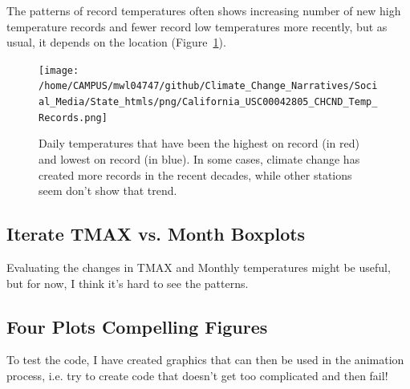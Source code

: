 \documentclass{article}
\begin{document}
\begin{knitrout}
\begin{kframe}
{\ttfamily\noindent\bfseries\color{errorcolor}{\#\# Error in h(simpleError(msg, call)): error in evaluating the argument 'x' in selecting a method for function 'plot': object 'R1' not found}}

{\ttfamily\noindent\bfseries\color{errorcolor}{\#\# Error in axis(2, at = ytics, labels = ylabs): object 'ytics' not found}}

{\ttfamily\noindent\bfseries\color{errorcolor}{\#\# Error in axis(1, at = xtics, labels = xlabs): object 'xtics' not found}}

{\ttfamily\noindent\bfseries\color{errorcolor}{\#\# Error in barplot(height = R1\$TMAX, space = 0, add = TRUE, axes = FALSE, : object 'R1' not found}}

{\ttfamily\noindent\bfseries\color{errorcolor}{\#\# Error in barplot(height = R1\$TMIN, space = 0, add = TRUE, axes = FALSE, : object 'R1' not found}}\end{kframe}
\end{knitrout}

The patterns of record temperatures often shows increasing number of new high temperature records  and fewer record low temperatures more recently, but as usual, it depends on the location (Figure~\ref{fig:Records}).
\begin{figure}
\texttt{[image: /home/CAMPUS/mwl04747/github/Climate\_Change\_Narratives/Social\_Media/State\_htmls/png/California\_USC00042805\_CHCND\_Temp\_Records.png]}
\caption{Daily temperatures that have been the highest on record (in red) and lowest on record (in blue). In some cases, climate change has created more records in the recent decades, while other stations seem don't show that trend.}
\label{fig:Records}
\end{figure}

\subsection{Iterate TMAX vs. Month Boxplots}

Evaluating the changes in TMAX and Monthly temperatures might be useful, but for now, I think it's hard to see the patterns. 




\subsection{Four Plots Compelling Figures}

To test the code, I have created graphics that can then be used in the animation process, i.e. try to create code that doesn't get too complicated and then fail! 
\end{document}
